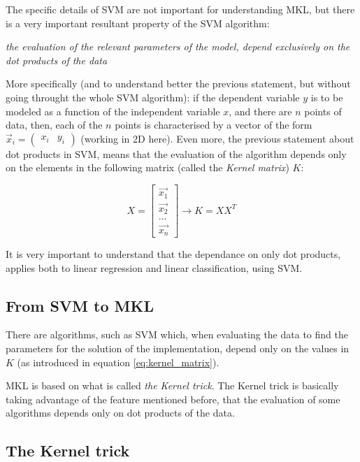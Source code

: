 \documentclass[paper=a4, fontsize=11pt]{scrartcl} %
\numberwithin{equation}{section} %
\numberwithin{figure}{section} %
\numberwithin{table}{section} %
\begin{document}
The specific details of SVM are not important for understanding MKL, but there is a very important resultant property of the SVM algorithm:

\begin{center}
\textit{the evaluation of the relevant parameters of the model, depend exclusively on the dot products of the data}
\end{center}

More specifically (and to understand better the previous statement, but without going throught the whole SVM algorithm): if the dependent variable $y$ is to be modeled as a function of the independent variable $x$, and there are $n$ points of data, then, each of the $n$ points is characterised by a vector of the form $\vec{x}_{i} = \begin{pmatrix} x_{i} & y_{i}\end{pmatrix}$ (working in 2D here). Even more, the previous statement about dot products in SVM, means that the evaluation of the algorithm depends only on the elements in the following matrix (called the \textit{Kernel matrix}) $K$:

\begin{equation}
 X=\begin{bmatrix}
  \vec{x_{1}} \\
  \vec{x_{2}} \\
  ...\\
  \vec{x_{n}}
 \end{bmatrix} \rightarrow 
  K = XX^{T}
\label{eq:kernel_matrix}
\end{equation}

It is very important to understand that the dependance on only dot products, applies both to linear regression and linear classification, using SVM.


\subsection{From SVM to MKL}

There are algorithms, such as SVM which, when evaluating the data to find the parameters for the solution of the implementation, depend only on the values in $K$ (as introduced in equation \ref{eq:kernel_matrix}).

MKL is based on what is called \textit{the Kernel trick}. The Kernel trick is basically taking advantage of the feature mentioned before, that the evaluation of some algorithms depends only on dot products of the data.

\subsection{The Kernel trick}
\end{document}
